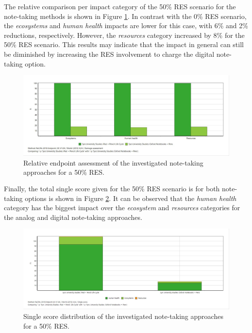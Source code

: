 The relative comparison per impact category of the 50\% RES scenario for the note-taking methods is shown in Figure \ref{fig:damage_assessment_RES_50}. In contrast with the 0\% RES scenario, the \textit{ecosystems} and \textit{human health} impacts are lower for this case, with 6\% and 2\% reductions, respectively. However, the \textit{resources} category increased by 8\% for the 50\% RES scenario. This results may indicate that the impact in general can still be diminished by increasing the RES involvement to charge the digital note-taking option.  

\begin{figure}[H]
    \centering
    \includegraphics[width=\textwidth]{images/RES_50/Damage_Assessment_RES_50.JPG}
    \caption{Relative endpoint assessment of the investigated note-taking approaches for a 50\% RES.}\label{fig:damage_assessment_RES_50}
\end{figure}

Finally, the total single score given for the 50\% RES scenario is for both note-taking options is shown in Figure \ref{fig:single_score_RES50}. It can be observed that the \textit{human health} category has the biggest impact over the \textit{ecosystem} and \textit{resources} categories for the analog and digital note-taking approaches. 

\begin{figure}[H]
    \centering
    \includegraphics[width=\textwidth]{images/RES_50/Single_Score_RES_50.JPG}
    \caption{Single score distribution of the investigated note-taking approaches for a 50\% RES.}\label{fig:single_score_RES50}
\end{figure}

